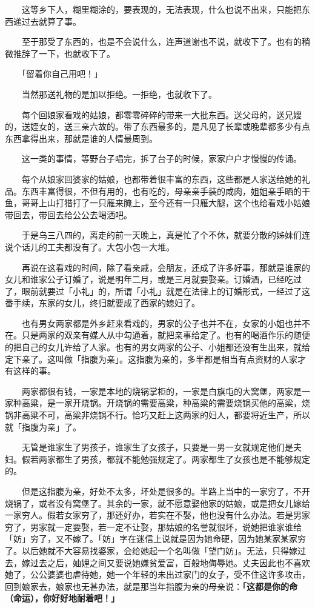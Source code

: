 \documentclass[UTF8]{ctexart}
\begin{document}
　　这等乡下人，糊里糊涂的，要表现的，无法表现，什么也说不出来，只能把东西递过去就算了事。

　　至于那受了东西的，也是不会说什么，连声道谢也不说，就收下了。也有的稍微推辞了一下，也就收下了。

　　「留着你自己用吧！」

　　当然那送礼物的是加以拒绝。一拒绝，也就收下了。

　　每个回娘家看戏的姑娘，都零零碎碎的带来一大批东西。送父母的，送兄嫂的，送姪女的，送三亲六故的。带了东西最多的，是凡见了长辈或晚辈都多少有点东西拿得出来，那就是谁的人情最周到。

　　这一类的事情，等野台子唱完，拆了台子的时候，家家户户才慢慢的传诵。

　　每个从娘家回婆家的姑娘，也都带着很丰富的东西，这些都是人家送给她的礼品。东西丰富得很，不但有用的，也有吃的，母亲亲手装的咸肉，姐姐亲手晒的干鱼，哥哥上山打猎打了一只雁来腌上，至今还有一只雁大腿，这个也给看戏小姑娘带回去，带回去给公公去喝洒吧。

　　于是乌三八四的，离走的前一天晚上，真是忙了个不休，就要分散的姊妹们连说个话儿的工夫都没有了。大包小包一大堆。

　　再说在这看戏的时间，除了看亲戚，会朋友，还成了许多好事，那就是谁家的女儿和谁家公子订婚了，说是明年二月，或是三月就要娶亲。订婚酒，已经吃过了，眼前就要过「小礼」的，所谓「小礼」就是在法律上的订婚形式，一经过了这番手续，东家的女儿，终归就要成了西家的媳妇了。

　　也有男女两家都是外乡赶来看戏的，男家的公子也并不在，女家的小姐也并不在。只是两家的双亲有媒人从中勾通着，就把亲事给定了。也有的喝酒作乐的随便的把自己的女儿许给了人家。也有的男女两家的公子、小姐都还没有生出来，就给定下亲了。这叫做「指腹为亲」。这指腹为亲的，多半都是相当有点资财的人家才有这样的事。

　　两家都很有钱，一家是本地的烧锅掌柜的，一家是白旗屯的大窝堡，两家是一家种高粱，是一家开烧锅。开烧锅的需要高粱，种高粱的需要烧锅买他的高粱，烧锅非高粱不可，高粱非烧锅不行。恰巧又赶上这两家的妇人，都要将近生产，所以就「指腹为亲」了。

　　无管是谁家生了男孩子，谁家生了女孩子，只要是一男一女就规定他们是夫妇。假若两家都生了男孩，都就不能勉强规定了。两家都生了女孩也是不能够规定的。

　　但是这指腹为亲，好处不太多，坏处是很多的。半路上当中的一家穷了，不开烧锅了，或者没有窝堡了。其余的一家，就不愿意娶他家的姑娘，或是把女儿嫁给一家穷人。假若女家穷了，那还好办，若实在不娶，他也没有什么办法。若是男家穷了，男家就一定要娶，若一定不让娶，那姑娘的名誉就很坏，说她把谁家谁给「妨」穷了，又不嫁了。「妨」字在迷信上说就是因为她命硬，因为她某家某家穷了。以后她就不大容易找婆家，会给她起一个名叫做「望门妨」。无法，只得嫁过去，嫁过去之后，妯娌之间又要说她嫌贫爱富，百般地侮辱她。丈夫因此也不喜欢她了，公公婆婆也虐待她，她一个年轻的未出过家门的女子，受不住这许多攻击，回到娘家去，娘家也无甚办法，就是那当年指腹为亲的母亲说：\textbf{「这都是你的命（命运），你好好地耐着吧！」}
\end{document}
